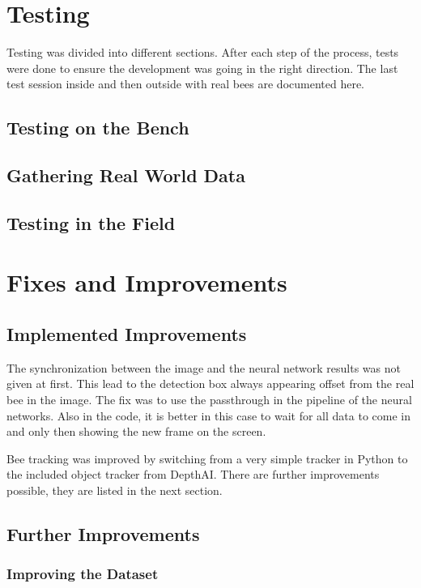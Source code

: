 \documentclass[a4paper,titlepage]{article}
\begin{document}
\newpage
\section{Testing}

Testing was divided into different sections.
After each step of the process, tests were done to ensure the development was going in the right direction.
The last test session inside and then outside with real bees are documented here.

\subsection{Testing on the Bench}
\subsection{Gathering Real World Data}
\subsection{Testing in the Field}

\newpage
\section{Fixes and Improvements}

\subsection{Implemented Improvements}

The synchronization between the image and the neural network results was not given at first.
This lead to the detection box always appearing offset from the real bee in the image.
The fix was to use the passthrough in the pipeline of the neural networks.
Also in the code, it is better in this case to wait for all data to come in and only then showing the new frame on the screen.

Bee tracking was improved by switching from a very simple tracker in Python to the included object tracker from DepthAI.
There are further improvements possible, they are listed in the next section.

\subsection{Further Improvements}

\subsubsection{Improving the Dataset}
\end{document}
